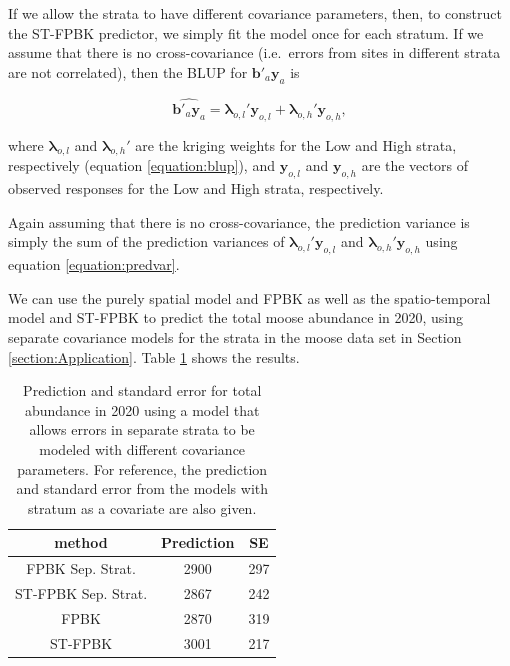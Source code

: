 \documentclass[smallextended]{svjour3}       %
\begin{document}
If we allow the strata to have different covariance parameters, then, to
construct the ST-FPBK predictor, we simply fit the model once for each
stratum. If we assume that there is no cross-covariance (i.e.~errors
from sites in different strata are not correlated), then the BLUP for
\(\mathbf{b}'_a \mathbf{y}_a\) is

\begin{equation} \label{equation:blup_strat}
\widehat{\mathbf{b}'_a \mathbf{y}_a} = \bm{\lambda}_{o, l}' \mathbf{y}_{o, l} + \bm{\lambda}_{o, h}' \mathbf{y}_{o, h},
\end{equation}

where \(\bm{\lambda}_{o, l}\) and \(\bm{\lambda}_{o, h}'\) are the
kriging weights for the Low and High strata, respectively (equation
\ref{equation:blup}), and \(\mathbf{y}_{o, l}\) and
\(\mathbf{y}_{o, h}\) are the vectors of observed responses for the Low
and High strata, respectively.

Again assuming that there is no cross-covariance, the prediction
variance is simply the sum of the prediction variances of
\(\bm{\lambda}_{o, l}' \mathbf{y}_{o, l}\) and
\(\bm{\lambda}_{o, h}' \mathbf{y}_{o, h}\) using equation
\ref{equation:predvar}.

We can use the purely spatial model and FPBK as well as the
spatio-temporal model and ST-FPBK to predict the total moose abundance
in 2020, using separate covariance models for the strata in the moose
data set in Section \ref{section:Application}. Table
\ref{tab:sepstratres} shows the results.

\begin{table}[H]

\caption{\label{tab:sepstratres}Prediction and standard error for total abundance in 2020 using a model that allows errors in separate strata to be modeled with different covariance parameters. For reference, the prediction and standard error from the models with stratum as a covariate are also given.}
\centering
\begin{tabular}[t]{ccc}
\toprule
method & Prediction & SE\\
\midrule
FPBK Sep. Strat. & 2900 & 297\\
ST-FPBK Sep. Strat. & 2867 & 242\\
\midrule
FPBK & 2870 & 319\\
ST-FPBK & 3001 & 217\\
\bottomrule
\end{tabular}
\end{table}
\end{document}
